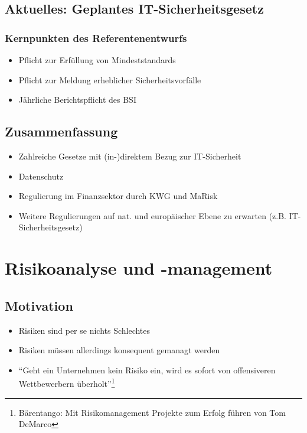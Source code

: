 \subsection{Aktuelles: Geplantes IT-Sicherheitsgesetz}

\subsubsection{Kernpunkten des Referentenentwurfs}
\begin{itemize}
	\item Pflicht zur Erfüllung von Mindeststandards
	\item Pflicht zur Meldung erheblicher Sicherheitsvorfälle
	\item Jährliche Berichtspflicht des BSI
\end{itemize}


\subsection{Zusammenfassung}
\begin{itemize}
	\item Zahlreiche Gesetze mit (in-)direktem Bezug zur IT-Sicherheit
	\item Datenschutz
	\item Regulierung im Finanzsektor durch KWG und MaRisk
	\item Weitere Regulierungen auf nat. und europäischer Ebene zu erwarten (z.B. IT-Sicherheitsgesetz)
\end{itemize}

\section{Risikoanalyse und -management}

\subsection{Motivation}
\begin{itemize}
	\item Risiken sind per se nichts Schlechtes
	\item Risiken müssen allerdings konsequent gemanagt werden
	\item "`Geht ein Unternehmen kein Risiko ein, wird es sofort von offensiveren Wettbewerbern überholt"'\footnote{Bärentango: Mit Risikomanagement Projekte zum Erfolg führen von Tom DeMarco}
\end{itemize}



